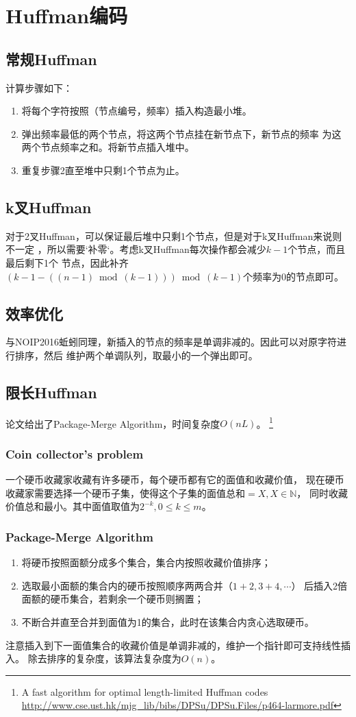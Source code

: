 \section{Huffman编码}
\subsection{常规Huffman}
计算步骤如下：
\begin{enumerate}
	\item 将每个字符按照（节点编号，频率）插入构造最小堆。
	\item 弹出频率最低的两个节点，将这两个节点挂在新节点下，新节点的频率
	      为这两个节点频率之和。将新节点插入堆中。
	\item 重复步骤2直至堆中只剩1个节点为止。
\end{enumerate}
\subsection{k叉Huffman}
对于2叉Huffman，可以保证最后堆中只剩1个节点，但是对于k叉Huffman来说则不一定
，所以需要`补零‘。考虑k叉Huffman每次操作都会减少$k-1$个节点，而且最后剩下1个
节点，因此补齐$(k-1 - ((n-1) \bmod (k-1))) \bmod (k-1)$个频率为0的节点即可。
\subsection{效率优化}
与NOIP2016蚯蚓同理，新插入的节点的频率是单调非减的。因此可以对原字符进行排序，然后
维护两个单调队列，取最小的一个弹出即可。
\subsection{限长Huffman}
论文\cite{LLH}给出了Package-Merge Algorithm，时间复杂度$O(nL)$。
\footnote{A fast algorithm for optimal length-limited Huffman codes\\
	\url{http://www.cse.ust.hk/mjg\_lib/bibs/DPSu/DPSu.Files/p464-larmore.pdf}
}
\subsubsection{Coin collector's problem}
一个硬币收藏家收藏有许多硬币，每个硬币都有它的面值和收藏价值，
现在硬币收藏家需要选择一个硬币子集，使得这个子集的面值总和$=X,X\in \mathbb{N}$，
同时收藏价值总和最小。其中面值取值为$2^{-k},0\leq k \leq m$。
\subsubsection{Package-Merge Algorithm}
\begin{enumerate}
	\item 将硬币按照面额分成多个集合，集合内按照收藏价值排序；
	\item 选取最小面额的集合内的硬币按照顺序两两合并（$1+2,3+4,\cdots$）
	      后插入2倍面额的硬币集合，若剩余一个硬币则搁置；
	\item 不断合并直至合并到面值为1的集合，此时在该集合内贪心选取硬币。
\end{enumerate}
注意插入到下一面值集合的收藏价值是单调非减的，维护一个指针即可支持线性插入。
除去排序的复杂度，该算法复杂度为$O(n)$。

